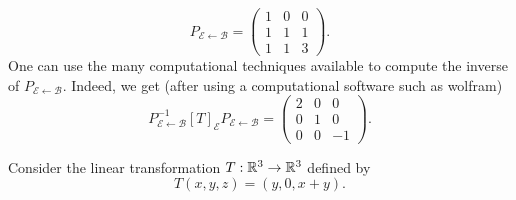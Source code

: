 \documentclass[a4paper]{article}
\begin{document}
\begin{solution}
\begin{enumerate}
        \[ P_{\mathcal{E} \leftarrow \mathcal{B} } = \begin{pmatrix} 1 & 0 & 0 \\ 1 & 1 & 1 \\ 1 & 1 & 3  \end{pmatrix}.  \]
        One can use the many computational techniques available to compute the inverse of \( P_{\mathcal{E} \leftarrow \mathcal{B} }  \). Indeed, we get (after using a computational software such as wolfram)
        \[  P^{-1}_{\mathcal{E} \leftarrow \mathcal{B}} [T]_{\mathcal{E}}^{}  {P}_{\mathcal{E} \leftarrow \mathcal{B}} = \begin{pmatrix} 2 & 0 & 0 \\ 0 & 1 & 0 \\ 0 & 0 & -1 \end{pmatrix}.  \]
    
\end{enumerate}
\end{solution}

\begin{problem}
    Consider the linear transformation \( T: \mathbb{R}^{3} \to \mathbb{R}^{3}  \) defined by 
    \[  T(x,y,z) = (y,0, x + y). \]
\end{problem}
\end{document}
